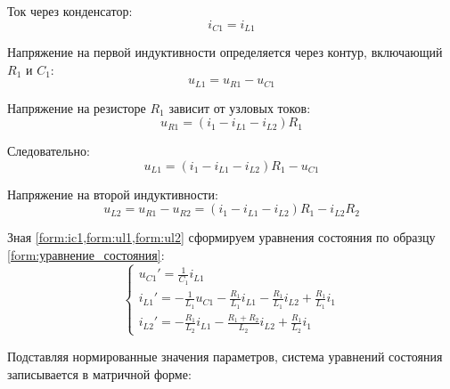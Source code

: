 Ток через конденсатор:
\begin{equation}
    i_{C1} = i_{L1}
    \label{form:ic1}
\end{equation}

Напряжение на первой индуктивности определяется через контур, включающий $R_1$ и $C_1$:
\begin{equation}
    u_{L1} = u_{R1} - u_{C1}
\end{equation}

Напряжение на резисторе $R_1$ зависит от узловых токов:
\begin{equation}
    u_{R1} = (i_1 - i_{L1} - i_{L2})R_1
\end{equation}

Следовательно:
\begin{equation}
    u_{L1} = (i_1 - i_{L1} - i_{L2})R_1 - u_{C1}
    \label{form:ul1}
\end{equation}

Напряжение на второй индуктивности:
\begin{equation}
    u_{L2} = u_{R1} - u_{R2} = (i_1 - i_{L1} - i_{L2})R_1 - i_{L2}R_2
    \label{form:ul2}
\end{equation}

Зная \cref{form:ic1,form:ul1,form:ul2} сформируем уравнения состояния по образцу \cref{form:уравнение_состояния}:
\begin{equation}
    \begin{cases}
        u_{C1}' = \frac{1}{C_1} i_{L1} \\
        i_{L1}' = -\frac{1}{L_1} u_{C1} - \frac{R_1}{L_1} i_{L1} - \frac{R_1}{L_1} i_{L2} + \frac{R_1}{L_1} i_1 \\
        i_{L2}' = -\frac{R_1}{L_2} i_{L1} - \frac{R_1 + R_2}{L_2} i_{L2} + \frac{R_1}{L_2} i_1
    \end{cases}
    \label{form:uravn_sost}
\end{equation}

Подставляя нормированные значения параметров, система уравнений состояния записывается в матричной форме:

